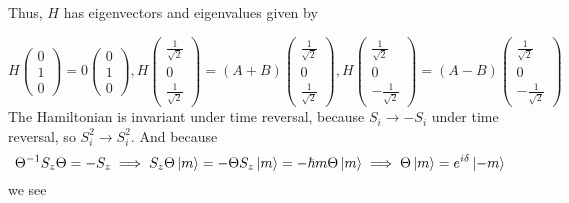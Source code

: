 \documentclass[12pt, letterpaper]{article}
\begin{document}
\begin{enumerate}
    Thus, $H$ has eigenvectors and eigenvalues given by
    
    \begin{equation}
        H\left(\begin{array}{c}0\\1\\0\end{array}\right)=0\left(\begin{array}{c}0\\1\\0\end{array}\right),H\left(\begin{array}{c}\frac{1}{\sqrt{2}}\\0\\\frac{1}{\sqrt{2}}\end{array}\right)=(A+B)\left(\begin{array}{c}\frac{1}{\sqrt{2}}\\0\\\frac{1}{\sqrt{2}}\end{array}\right),H\left(\begin{array}{c}\frac{1}{\sqrt{2}}\\0\\-\frac{1}{\sqrt{2}}\end{array}\right)=(A-B)\left(\begin{array}{c}\frac{1}{\sqrt{2}}\\0\\-\frac{1}{\sqrt{2}}\end{array}\right)
    \end{equation}
    The Hamiltonian is invariant under time reversal, because $S_i\to -S_i$ under time reversal, so $S_i^2\to S_i^2$. And because 
    \begin{equation}
        \Theta^{-1}S_z\Theta =-S_z\implies S_z\Theta\ket{m}=-\Theta S_z\ket{m}=-\hbar m\Theta\ket{m}\implies \Theta\ket{m}=e^{i\delta }\ket{-m}
    \end{equation}
    we see
    \begin{align}

\end{align}
\end{enumerate}
\end{document}
